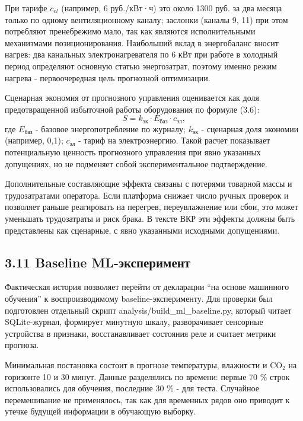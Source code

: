 \documentclass[a4paper,14pt]{extarticle}
\renewcommand{\texttt}[1]{\textnormal{#1}}
\begin{document}
При тарифе \(c_{el}\) (например, 6 руб./кВт·ч) это около 1300 руб. за
два месяца только по одному вентиляционному каналу; заслонки (каналы 9,
11) при этом потребляют пренебрежимо мало, так как являются
исполнительными механизмами позиционирования. Наибольший вклад в
энергобаланс вносит нагрев: два канальных электронагревателя по 6 кВт
при работе в холодный период определяют основную статью энергозатрат,
поэтому именно режим нагрева - первоочередная цель прогнозной
оптимизации.

Сценарная экономия от прогнозного управления оценивается как доля
предотвращенной избыточной работы оборудования по формуле (3.6):
\begin{equation}
S = k_{\text{эк}} \cdot E_{\text{баз}} \cdot c_{\text{эл}},
\tag{3.6}
\end{equation}
где \(E_{\text{баз}}\) - базовое энергопотребление по журналу;
\(k_{\text{эк}}\) - сценарная доля экономии (например, 0,1);
\(c_{\text{эл}}\) - тариф на электроэнергию. Такой расчет показывает
потенциальную ценность прогнозного управления при явно указанных
допущениях, но не подменяет собой экспериментальное подтверждение.

Дополнительные составляющие эффекта связаны с потерями товарной массы и
трудозатратами оператора. Если платформа снижает число ручных проверок и
позволяет раньше реагировать на перегрев, переувлажнение или сбои, это
может уменьшать трудозатраты и риск брака. В тексте ВКР эти эффекты
должны быть представлены как сценарные, с явно указанными исходными
допущениями.

\hypertarget{baseline-ml-ux44dux43aux441ux43fux435ux440ux438ux43cux435ux43dux442}{%
\subsection{3.11 Baseline
ML-эксперимент}\label{baseline-ml-ux44dux43aux441ux43fux435ux440ux438ux43cux435ux43dux442}}

Фактическая история позволяет перейти от декларации ``на основе
машинного обучения'' к воспроизводимому baseline-эксперименту. Для
проверки был подготовлен отдельный скрипт
\texttt{analysis/build\_ml\_baseline.py}, который читает SQLite-журнал,
формирует минутную шкалу, разворачивает сенсорные устройства в признаки,
восстанавливает состояния реле и считает метрики прогноза.

Минимальная постановка состоит в прогнозе температуры, влажности и
CO\(_2\) на горизонте 10 и 30 минут. Данные разделялись по времени:
первые 70 \% строк использовались для обучения, последние 30 \% - для
теста. Случайное перемешивание не применялось, так как для временных
рядов оно приводит к утечке будущей информации в обучающую выборку.
\end{document}

